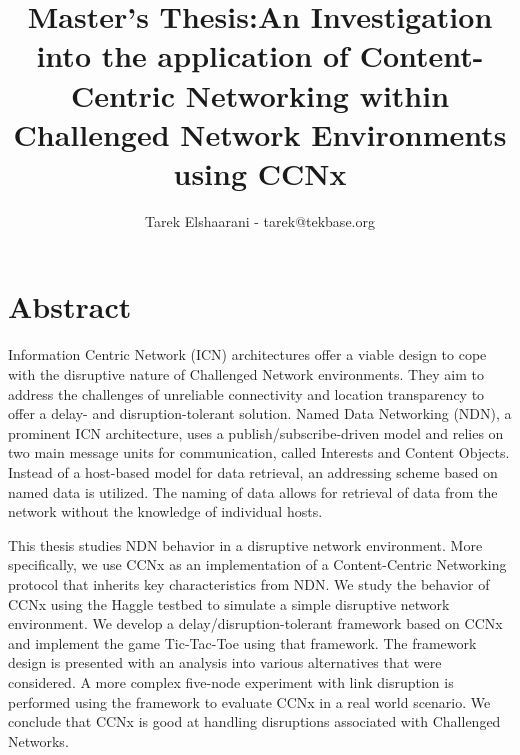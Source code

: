 \documentclass[a4paper,12pt]{report}      %
\title{Master's Thesis:\endgraf An Investigation into the application of Content-Centric Networking within Challenged Network Environments using CCNx}
\author{Tarek Elshaarani - tarek@tekbase.org }
\date{\parbox{\linewidth}{\centering
  \bigskip
  \today\endgraf
  \vspace*{4cm}
  Supervisors: \endgraf
  \hspace*{1cm} Frederik Hermans   - frederik.hermans@it.uu.se \endgraf
  \hspace*{1cm} Ferdrik Bjurefors  - fredrik.bjurefors@it.uu.se \endgraf
  \bigskip
  Reviewer: \endgraf
  \hspace*{1cm} Christian Rohner   - christian.rohner@it.uu.se \endgraf
  \bigskip\bigskip
  Department of Information Technology\endgraf
  Uppsala Universitet}}
\begin{document}
\maketitle


\pagebreak
\chapter*{}
\setcounter{page}{2}

\pagebreak
\chapter*{Abstract}

Information Centric Network (ICN) architectures offer a viable design to cope with the disruptive nature of Challenged Network environments. They aim to address the challenges of unreliable connectivity and location transparency to offer a delay- and disruption-tolerant solution. Named Data Networking (NDN), a prominent ICN architecture, uses a publish/subscribe-driven model and relies on two main message units for communication, called Interests and Content Objects. Instead of a host-based model for data retrieval, an addressing scheme based on named data is utilized. The naming of data allows for retrieval of data from the network without the knowledge of individual hosts.

This thesis studies NDN behavior in a disruptive network environment. More specifically, we use CCNx as an implementation of a Content-Centric Networking protocol that inherits key characteristics from NDN. We study the behavior of CCNx using the Haggle testbed to simulate a simple disruptive network environment. We develop a delay/disruption-tolerant framework based on CCNx and implement the game Tic-Tac-Toe using that framework. The framework design is presented with an analysis into various alternatives that were considered. A more complex five-node experiment with link disruption is performed using the framework to evaluate CCNx in a real world scenario. We conclude that CCNx is good at handling disruptions associated with Challenged Networks.


\pagebreak
\chapter*{}
\end{document}
